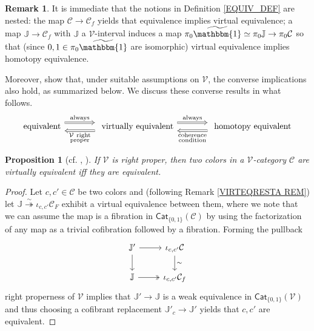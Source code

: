 \documentclass[a4paper,10pt
,draft
]{article}%
\numberwithin{equation}{section}
\numberwithin{figure}{section}
\newtheorem{proposition}[equation]{Proposition}%
\theoremstyle{definition} %
\newtheorem{remark}[equation]{Remark}%
\newcommand{\V}{\ensuremath{\mathcal V}}
\newcommand{\1}{\ensuremath{\mathbbm 1}}%
\begin{document}
\begin{remark}
It is immediate that the notions in Definition \ref{EQUIV_DEF}
are nested: the map $\mathcal{C} \to \mathcal{C}_f$
yields that equivalence implies virtual equivalence;
a map $\mathbb{J} \to \mathcal{C}_f$
with $\mathbb{J}$ a $\mathcal{V}$-interval
induces a map
$\pi_0 \widetilde{\mathbbm{1}} \simeq \pi_0 \mathbb{J} \to \pi_0 \mathcal{C}$ so that (since $0,1 \in \pi_0 \widetilde{\mathbbm{1}}$ are isomorphic)
virtual equivalence implies homotopy equivalence.

Moreover, \cite{BM13,Cav} show that, under suitable assumptions on $\V$, the converse implications also hold, as summarized below.
We discuss these converse results in what follows.
\begin{equation}\label{BASCOMP EQ}
\begin{tikzcd}[column sep = large]
            \mbox{equivalent}
            \arrow[r, Rightarrow, shift left=2, "\mathrm{always}"]
            &
            \mbox{ virtually equivalent}
            \arrow[r, Rightarrow, shift left=2, "\mathrm{always}"]
            \arrow[l, Rightarrow, shift left = 2, "\substack{$\V\phantom{ }$\mathrm{right} \\ \mathrm{proper}}"]
            &
            \mbox{ homotopy equivalent}
            \arrow[l, Rightarrow, shift left = 2, "\substack{\mathrm{coherence} \\ \mathrm{condition}}"]
\end{tikzcd}
\end{equation}
\end{remark}



\begin{proposition}[{cf. \cite[4.12]{Cav}, \cite[2.10]{BM13}}] \label{RIGHTPROPER PROP}
If $\V$ is right proper, then two colors in a $\V$-category $\mathcal{C}$ are virtually equivalent iff they are equivalent. 
\end{proposition}


\begin{proof}
Let $c,c'\in \mathcal{C}$ be two colors and (following Remark \ref{VIRTEQRESTA REM})
let $\mathbb{J} \overset{\sim}{\twoheadrightarrow} \iota_{c,c'} \mathcal{C}_F$
exhibit a virtual equivalence between them, where we note
that we can assume the map is a fibration in $\mathsf{Cat}_{\{0,1\}}(\mathcal{C})$
by using the factorization of any map as a trivial cofibration followed by a fibration.
Forming the pullback
\begin{equation}\label{RIGHTPROPER EQ}
\begin{tikzcd}
		 \mathbb{J}' \ar{r} \arrow{d}
	&
		\iota_{c,c'} \mathcal{C} \arrow{d}{\sim}
\\
		\mathbb{J} \ar[twoheadrightarrow]{r} 
	&
		\iota_{c,c'}\mathcal{C}_f
\end{tikzcd}
\end{equation}
right properness of $\V$ implies 
that $\mathbb{J}' \to \mathbb{J}$ is a weak equivalence in 
$\mathsf{Cat}_{\{0,1\}}(\V)$
and thus choosing a cofibrant replacement
$\mathbb{J}'_c \to \mathbb{J}'$
yields that $c,c'$ are equivalent.
\end{proof}
\end{document}
